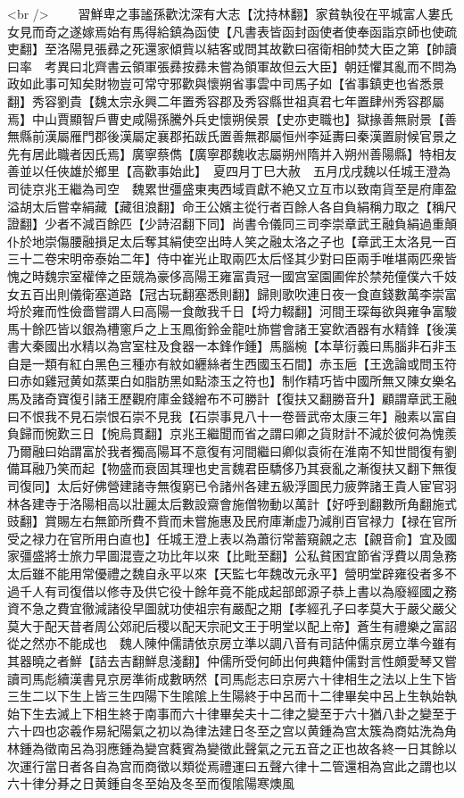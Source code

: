 <br />
　　習鮮卑之事謐孫歡沈深有大志【沈持林翻】家貧執役在平城富人婁氏女見而奇之遂嫁焉始有馬得給鎮為函使【凡書表皆函封函使者使奉函詣京師也使疏吏翻】至洛陽見張彞之死還家傾貲以結客或問其故歡曰宿衛相帥焚大臣之第【帥讀曰率　考異曰北齊書云領軍張彞按彞未嘗為領軍故但云大臣】朝廷懼其亂而不問為政如此事可知矣財物豈可常守邪歡與懷朔省事雲中司馬子如【省事鎮吏也省悉景翻】秀容劉貴【魏太宗永興二年置秀容郡及秀容縣世祖真君七年置肆州秀容郡屬焉】中山賈顯智戶曹史咸陽孫騰外兵史懷朔侯景【史亦吏職也】獄掾善無尉景【善無縣前漢屬雁門郡後漢屬定襄郡拓跋氏置善無郡屬恒州李延夀曰秦漢置尉候官景之先有居此職者因氏焉】廣寧蔡儁【廣寧郡魏收志屬朔州隋并入朔州善陽縣】特相友善並以任俠雄於鄉里【高歡事始此】　夏四月丁巳大赦　五月戊戌魏以任城王澄為司徒京兆王繼為司空　魏累世彊盛東夷西域貢獻不絶又立互市以致南貨至是府庫盈溢胡太后嘗幸絹藏【藏徂浪翻】命王公嬪主從行者百餘人各自負絹稱力取之【稱尺證翻】少者不減百餘匹【少詩沼翻下同】尚書令儀同三司李崇章武王融負絹過重顛仆於地崇傷腰融損足太后奪其絹使空出時人笑之融太洛之子也【章武王太洛見一百三十二卷宋明帝泰始二年】侍中崔光止取兩匹太后怪其少對曰臣兩手唯堪兩匹衆皆愧之時魏宗室權倖之臣競為豪侈高陽王雍富貴冠一國宫室園圃侔於禁苑僮僕六千妓女五百出則儀衛塞道路【冠古玩翻塞悉則翻】歸則歌吹連日夜一食直錢數萬李崇富埒於雍而性儉嗇嘗謂人曰高陽一食敵我千日【埒力輟翻】河間王琛每欲與雍争富駿馬十餘匹皆以銀為槽窻戶之上玉鳳銜鈴金龍吐斾嘗會諸王宴飲酒器有水精鋒【後漢書大秦國出水精以為宫室柱及食器一本鋒作鍾】馬腦椀【本草衍義曰馬腦非石非玉自是一類有紅白黑色三種亦有紋如纒絲者生西國玉石間】赤玉巵【王逸論或問玉符曰赤如雞冠黄如蒸栗白如脂肪黑如點漆玉之符也】制作精巧皆中國所無又陳女樂名馬及諸奇寶復引諸王歷觀府庫金錢繒布不可勝計【復扶又翻勝音升】顧謂章武王融曰不恨我不見石崇恨石崇不見我【石崇事見八十一卷晉武帝太康三年】融素以富自負歸而惋歎三日【惋烏貫翻】京兆王繼聞而省之謂曰卿之貨財計不減於彼何為愧羨乃爾融曰始謂富於我者獨高陽耳不意復有河間繼曰卿似袁術在淮南不知世間復有劉備耳融乃笑而起【物盛而衰固其理也史言魏君臣驕侈乃其衰亂之漸復扶又翻下無復司復同】太后好佛營建諸寺無復窮已令諸州各建五級浮圖民力疲弊諸王貴人宦官羽林各建寺于洛陽相高以壯麗太后數設齋會施僧物動以萬計【好呼到翻數所角翻施式豉翻】賞賜左右無節所費不貲而未嘗施惠及民府庫漸虚乃減削百官禄力【禄在官所受之禄力在官所用白直也】任城王澄上表以為蕭衍常蓄窺覦之志【覦音俞】宜及國家彊盛將士旅力早圖混壹之功比年以來【比毗至翻】公私貧困宜節省浮費以周急務太后雖不能用常優禮之魏自永平以來【天監七年魏改元永平】營明堂辟雍役者多不過千人有司復借以修寺及供它役十餘年竟不能成起部郎源子恭上書以為廢經國之務資不急之費宜徹減諸役早圖就功使祖宗有嚴配之期【孝經孔子曰孝莫大于嚴父嚴父莫大于配天昔者周公郊祀后稷以配天宗祀文王于明堂以配上帝】蒼生有禮樂之富詔從之然亦不能成也　魏人陳仲儒請依京房立準以調八音有司詰仲儒京房立準今雖有其器曉之者鮮【詰去吉翻鮮息淺翻】仲儒所受何師出何典籍仲儒對言性頗愛琴又嘗讀司馬彪續漢書見京房準術成數昞然【司馬彪志曰京房六十律相生之法以上生下皆三生二以下生上皆三生四陽下生隂隂上生陽終于中呂而十二律畢矣中呂上生執始執始下生去滅上下相生終于南事而六十律畢矣夫十二律之變至于六十猶八卦之變至于六十四也宓羲作易紀陽氣之初以為律法建日冬至之宫以黄鍾為宫太簇為商姑洗為角林鍾為徵南呂為羽應鍾為變宫蕤賓為變徵此聲氣之元五音之正也故各終一日其餘以次運行當日者各自為宫而商徵以類從焉禮運曰五聲六律十二管還相為宫此之謂也以六十律分朞之日黄鍾自冬至始及冬至而復隂陽寒燠風